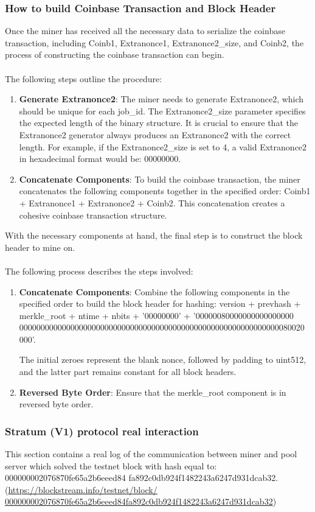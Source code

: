 \subsubsection{How to build Coinbase Transaction and Block Header}
Once the miner has received all the necessary data to serialize the coinbase transaction, including Coinb1, Extranonce1, Extranonce2\_size, and Coinb2, the process of constructing the coinbase transaction can begin. \\\\
The following steps outline the procedure:
\begin{enumerate}
    \item \textbf{Generate Extranonce2}: The miner needs to generate Extranonce2, which should be unique for each job\_id. The Extranonce2\_size parameter specifies the expected length of the binary structure. It is crucial to ensure that the Extranonce2 generator always produces an Extranonce2 with the correct length. For example, if the Extranonce2\_size is set to 4, a valid Extranonce2 in hexadecimal format would be: 00000000.
    \item \textbf{Concatenate Components}: To build the coinbase transaction, the miner concatenates the following components together in the specified order: Coinb1 + Extranonce1 + Extranonce2 + Coinb2. This concatenation creates a cohesive coinbase transaction structure.
\end{enumerate}

\noindent With the necessary components at hand, the final step is to construct the block header to mine on. \\\\
The following process describes the steps involved:
\begin{enumerate}
    \item \textbf{Concatenate Components}: Combine the following components in the specified order to build the block header for hashing: version + prevhash + merkle\_root + ntime + nbits + '00000000' + '00000080000000000000000
    0000000000000000000000000000000000000000000000000000000000000080020
    000'.
    
    The initial zeroes represent the blank nonce, followed by padding to uint512, and the latter part remains constant for all block headers.
    \item \textbf{Reversed Byte Order}: Ensure that the merkle\_root component is in reversed byte order. 
\end{enumerate}
\newpage
\subsubsection{Stratum (V1) protocol real interaction}
This section contains a real log of the communication between miner and pool server which solved the testnet block with hash equal to: 000000002076870fe65a2b6eeed84
fa892c0db924f1482243a6247d931dcab32. (\href{https://blockstream.info/testnet/block/000000002076870fe65a2b6eeed84fa892c0db924f1482243a6247d931dcab32}{https://blockstream.info/testnet/block/\\000000002076870fe65a2b6eeed84fa892c0db924f1482243a6247d931dcab32})

